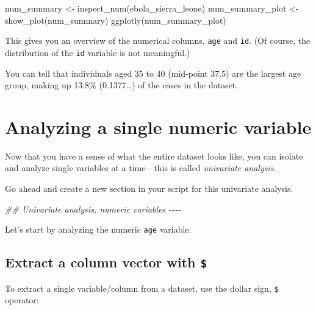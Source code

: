 \documentclass[
  letterpaper,
  DIV=11,
  numbers=noendperiod]{scrreprt}
\newenvironment{Shaded}{\begin{snugshade}}{\end{snugshade}}
\newcommand{\CommentTok}[1]{\textcolor[rgb]{0.37,0.37,0.37}{#1}}
\newcommand{\DocumentationTok}[1]{\textcolor[rgb]{0.37,0.37,0.37}{\textit{#1}}}
\newcommand{\FunctionTok}[1]{\textcolor[rgb]{0.28,0.35,0.67}{#1}}
\newcommand{\NormalTok}[1]{\textcolor[rgb]{0.00,0.23,0.31}{#1}}
\newcommand{\OtherTok}[1]{\textcolor[rgb]{0.00,0.23,0.31}{#1}}
\newcommand{\SpecialCharTok}[1]{\textcolor[rgb]{0.37,0.37,0.37}{#1}}
\begin{document}
\begin{Shaded}
\begin{Highlighting}[]
\NormalTok{num\_summary }\OtherTok{\textless{}{-}} \FunctionTok{inspect\_num}\NormalTok{(ebola\_sierra\_leone)}
\NormalTok{num\_summary\_plot }\OtherTok{\textless{}{-}} \FunctionTok{show\_plot}\NormalTok{(num\_summary)}
\FunctionTok{ggplotly}\NormalTok{(num\_summary\_plot)}
\end{Highlighting}
\end{Shaded}

This gives you an overview of the numerical columns, \texttt{age} and
\texttt{id}. (Of course, the distribution of the \texttt{id} variable is
not meaningful.)

You can tell that individuals aged 35 to 40 (mid-point 37.5) are the
largest age group, making up 13.8\% (0.1377\ldots) of the cases in the
dataset.

\section{Analyzing a single numeric
variable}\label{analyzing-a-single-numeric-variable}

Now that you have a sense of what the entire dataset looks like, you can
isolate and analyze single variables at a time---this is called
\emph{univariate analysis}.

Go ahead and create a new section in your script for this univariate
analysis.

\begin{Shaded}
\begin{Highlighting}[]
\DocumentationTok{\#\# Univariate analysis, numeric variables {-}{-}{-}{-}}
\end{Highlighting}
\end{Shaded}

Let's start by analyzing the numeric \texttt{age} variable.

\subsection{\texorpdfstring{Extract a column vector with
\texttt{\$}}{Extract a column vector with \$}}\label{extract-a-column-vector-with}

To extract a single variable/column from a dataset, use the dollar sign,
\texttt{\$} operator:

\begin{Shaded}
\end{Shaded}
\end{document}
